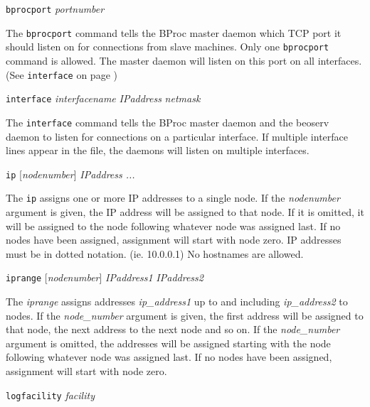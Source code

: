 \begin{description}

\item{\texttt{bprocport} \emph{portnumber}}
\label{conf:bprocport}

The \texttt{bprocport} command tells the BProc master daemon which TCP
port it should listen on for connections from slave machines.  Only
one \texttt{bprocport} command is allowed.  The master daemon will
listen on this port on all interfaces.  (See \texttt{interface} on
page \pageref{conf:interface})

\item{\texttt{interface} \emph{interfacename} \emph{IPaddress} \emph{netmask}}
\label{conf:interface}

The \texttt{interface} command tells the BProc master daemon
and the beoserv daemon to listen for connections on a particular
interface.  If multiple interface lines appear in the file, the
daemons will listen on multiple interfaces.


\item{\texttt{ip} [\emph{nodenumber}] \emph{IPaddress ... }}
\label{conf:ip}

The \texttt{ip} assigns one or more IP addresses to a single node.  If
the \emph{nodenumber} argument is given, the IP address will be
assigned to that node.  If it is omitted, it will be assigned to the
node following whatever node was assigned last.  If no nodes have been
assigned, assignment will start with node zero.  IP addresses must be
in dotted notation. (ie. 10.0.0.1) No hostnames are allowed.

\item{\texttt{iprange} [\emph{nodenumber}] \emph{IPaddress1} \emph{IPaddress2}}
\label{conf:iprange}

The \emph{iprange} assigns addresses \emph{ip\_address1} up to and
including \emph{ip\_address2} to nodes.  If the \emph{node\_number}
argument is given, the first address will be assigned to that node,
the next address to the next node and so on.  If the
\emph{node\_number} argument is omitted, the addresses will be assigned
starting with the node following whatever node was assigned last.  If
no nodes have been assigned, assignment will start with node zero.

\item{\texttt{logfacility} \emph{facility}}
\label{conf:logfacility}


\end{description}
